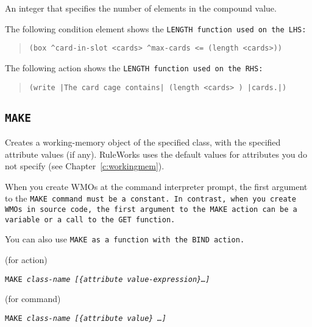 An integer that specifies the number of elements in the
compound value.

\Example

The following condition element shows the \tt{LENGTH} function used on
the LHS:

\begin{quote}
\begin{verbatim}
(box ^card-in-slot <cards> ^max-cards <= (length <cards>))
\end{verbatim}
\end{quote}

The following action shows the \tt{LENGTH} function used on the RHS:

\begin{quote}
\begin{verbatim}
(write |The card cage contains| (length <cards> ) |cards.|)
\end{verbatim}
\end{quote}

\subsection{\tt{MAKE}}

Creates a working-memory object of the specified class, with the
specified attribute values (if any). RuleWorks uses the default values
for attributes you do not specify (see Chapter~\ref{c:workingmem}).

\begin{note}
  When you create WMOs at the command interpreter prompt, the first
  argument to the \tt{MAKE} command must be a constant. In contrast,
  when you create WMOs in source code, the first argument to the
  \tt{MAKE} action can be a variable or a call to the \tt{GET}
  function.
\end{note}

You can also use \tt{MAKE} as a function with the \tt{BIND} action.

\Format (for action)

\tt{MAKE} \it{class-name} [\{\ct\it{attribute} \it{value-expression}\}\ldots]

\Format (for command)

\tt{MAKE} \it{class-name} [\{\ct\it{attribute} \it{value}\} \ldots]

